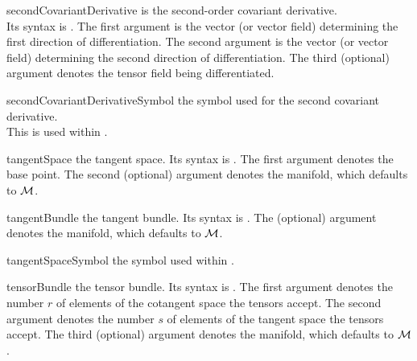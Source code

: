 \documentclass[english,a4paper,DIV=12,parskip=full,oneside]{scrartcl}
\begin{document}
\begin{commandlist}
		\par{}
		\par{}
	\item[secondCovariantDerivative]\hspace*{3em}is the second-order covariant derivative.\\
		Its syntax is .
		The first argument is the vector (or vector field) determining the first direction of differentiation.
		The second argument is the vector (or vector field) determining the second direction of differentiation.
		The third (optional) argument denotes the tensor field being differentiated.
		\par{}
	\item[secondCovariantDerivativeSymbol]\hspace*{6em} the symbol used for the second covariant derivative.\\
        This is used within \codeCommand{\secondCovariantDerivative}.
		\par\mathCodeExample{\secondCovariantDerivativeSymbol}
	\item[tangentSpace] the tangent space.
		Its syntax is .
		The first argument denotes the base point.
		The second (optional) argument denotes the manifold, which defaults to $\mathcal{M}$.
		\par{}
		\par{}
	\item[tangentBundle] the tangent bundle.
		Its syntax is \codeCommand{\tangentBundle[#1]}.
		The (optional) argument denotes the manifold, which defaults to $\mathcal{M}$.
		\par\mathCodeExample{\tangentBundle}
		\par\mathCodeExample{\tangentBundle[\cN]}
	\item[tangentSpaceSymbol] the symbol used within \codeCommand{\tangent}.
		\par\mathCodeExample{\tangentSpaceSymbol}
	\item[tensorBundle] the tensor bundle.
		Its syntax is .
		The first argument denotes the number $r$ of elements of the cotangent space the tensors accept.
		The second argument denotes the number $s$ of elements of the tangent space the tensors accept.
		The third (optional) argument denotes the manifold, which defaults to $\mathcal{M}$.

\end{commandlist}
\end{document}
